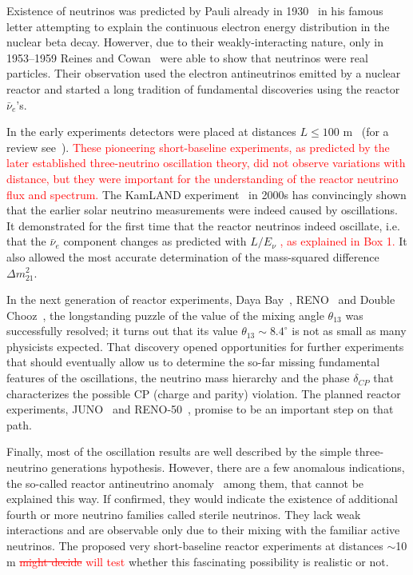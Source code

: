 \documentclass[aps,twocolumn,preprintnumbers,amsmath,superscriptaddress,amssymb,floats,nofootinbib]{revtex4-1}
\begin{document}
Existence of neutrinos was predicted by Pauli already in 1930~\cite{Pauli30} in his famous letter attempting to explain the continuous electron energy distribution in the nuclear beta decay. 
Howerver, due to their weakly-interacting nature, only in 1953--1959 Reines and Cowan~\cite{Reines53,Cowan56,Reines59} were able to show that neutrinos were real particles. 
Their observation used the electron antineutrinos emitted by a nuclear reactor and started a long tradition of fundamental discoveries using the reactor $\bar{\nu}_e$'s.

In the early experiments detectors were placed at distances $L \le 100$ m~\cite{ILL,Gosgen,Rovno,Krasnoyarsk,SRP,Bugey4,Bugey3} (for a review see~\cite{Bemporad02}). 
\textcolor{red}{These pioneering short-baseline experiments, as predicted by the later established three-neutrino oscillation theory, did not observe variations with distance, but they were important for the understanding of the reactor neutrino flux and spectrum.}
The KamLAND experiment~\cite{Kamland03,Kamland05,Kamland08} in 2000s has convincingly shown that the earlier solar neutrino measurements were indeed caused by oscillations. 
It demonstrated for the first time that the reactor neutrinos indeed oscillate, i.e. that the $\bar{\nu}_e$ component changes as predicted with $L/E_{\nu}$ \textcolor{red}{, as explained in Box 1.}
It also allowed the most accurate determination of the mass-squared difference $\Delta m^2_{21}$.  

In the next generation of reactor experiments, Daya Bay~\cite{Dayabay,Dayabay14}, RENO~\cite{Reno}  and Double Chooz~\cite{DChooz,DChooz14}, the longstanding puzzle of the
value of the mixing angle $\theta_{13}$ was successfully resolved; it turns out that its value $\theta_{13} \sim 8.4^\circ$
is not as small as many physicists expected. That discovery opened opportunities for further experiments that should eventually allow us to determine the so-far missing fundamental features of the oscillations, the neutrino mass hierarchy and the phase $\delta_{CP}$ that characterizes the possible CP (charge and parity) violation. 
The planned reactor experiments, JUNO~\cite{He-NuFact13} and RENO-50~\cite{RENO-50}, promise to be an important step on that path.

Finally, most of the oscillation results are well described by the simple three-neutrino generations hypothesis. However, there are a few anomalous indications,
the so-called reactor antineutrino anomaly~\cite{Mention} among them, that cannot be explained this way. If confirmed, they would indicate the existence of additional
fourth or more neutrino families called sterile neutrinos. They lack weak interactions and are observable only due to their mixing with the familiar active neutrinos.  The proposed very short-baseline reactor experiments at distances $\sim$10 m \textcolor{red}{\st{might decide} will test} whether this fascinating possibility is realistic or not.
\end{document}
